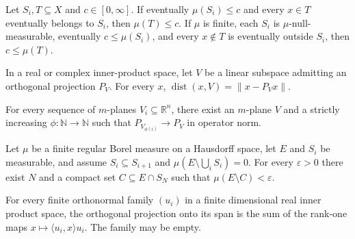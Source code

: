 \begin{lemma}
\label{lem:moving-set-measure-bounds}

Let $S_i,T\subseteq X$ and $c\in[0,\infty]$. If eventually $\mu(S_i)\le c$ and every $x\in T$ eventually belongs to $S_i$, then $\mu(T)\le c$. If $\mu$ is finite, each $S_i$ is $\mu$-null-measurable, eventually $c\le\mu(S_i)$, and every $x\notin T$ is eventually outside $S_i$, then $c\le\mu(T)$.
\end{lemma}

\begin{lemma}
\label{lem:projection-distance}

In a real or complex inner-product space, let $V$ be a linear subspace admitting an orthogonal projection $P_V$. For every $x$, $\operatorname{dist}(x,V)=\lVert x-P_Vx\rVert$.
\end{lemma}

\begin{lemma}
\label{lem:plane-projection-subsequence}

For every sequence of $m$-planes $V_i\subseteq\mathbb R^n$, there exist an $m$-plane $V$ and a strictly increasing $\phi:\mathbb N\to\mathbb N$ such that $P_{V_{\phi(i)}}\to P_V$ in operator norm.
\end{lemma}

\begin{lemma}
\label{lem:compact-measurable-exhaustion}

Let $\mu$ be a finite regular Borel measure on a Hausdorff space, let $E$ and $S_i$ be measurable, and assume $S_i\subseteq S_{i+1}$ and $\mu(E\setminus\bigcup_i S_i)=0$. For every $\varepsilon>0$ there exist $N$ and a compact set $C\subseteq E\cap S_N$ such that $\mu(E\setminus C)<\varepsilon$.
\end{lemma}

\begin{lemma}
\label{lem:orthonormal-span-projection}

For every finite orthonormal family $(u_i)$ in a finite dimensional real inner product space, the orthogonal projection onto its span is the sum of the rank-one maps $x\mapsto\langle u_i,x\rangle u_i$. The family may be empty.
\end{lemma}


